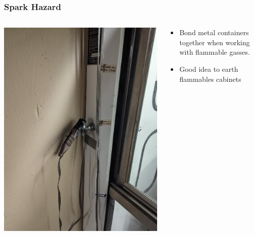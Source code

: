 \documentclass{presentation}
\begin{document}
\begin{frame}\frametitle{Spark Hazard}
  \begin{columns}
    \begin{column}{0.4\textwidth}
      \includegraphics[width=\textwidth]{"./solvent.jpg"}
    \end{column}
    \begin{column}{0.6\textwidth}
      \begin{itemize}
        \item Bond metal containers together when working with flammable gasses.
        \item Good idea to earth flammables cabinets
      \end{itemize}
    \end{column}
  \end{columns}
\end{frame}
\end{document}
